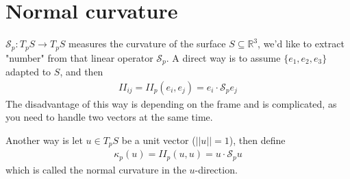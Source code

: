 \documentclass[10pt]{article}
\begin{document}
        \section{Normal curvature}
            $\mathcal{S}_p: T_pS\rightarrow T_pS$ measures the curvature of the surface $S\subseteq\mathbb{R}^3$, we'd like to extract "number" from that linear operator $\mathcal{S}_p$. A direct way is to assume $\{e_1, e_2, e_3\}$ adapted to $S$, and then
            \begin{equation*}
                \begin{aligned}
                    II_{ij} = II_p(e_i, e_j) = e_i\cdot\mathcal{S}_pe_j
                \end{aligned}
            \end{equation*}
            The disadvantage of this way is depending on the frame and is complicated, as you need to handle two vectors at the same time. 
            \begin{definition}
                Another way is let $u\in T_pS$ be a unit vector ($||u||=1$), then define
                \begin{equation*}
                    \begin{aligned}
                        \kappa_p(u) = II_p(u, u) = u\cdot\mathcal{S}_pu
                    \end{aligned}
                \end{equation*}
                which is called the normal curvature in the $u$-direction.    
            \end{definition}
            
\end{document}
